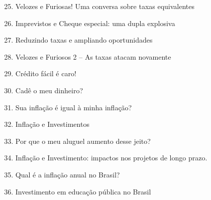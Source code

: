 \begin{apresentacao}
\begin{multicols}{3}
\begin{enumerate}[label=Atividade \arabic* --, wide]\setcounter{enumi}{24}
\item Velozes e Furiosas! Uma conversa sobre taxas equivalentes
\end{enumerate}
\begin{enumerate}[label=Atividade \arabic* --, wide]\setcounter{enumi}{25}
\item Imprevistos e Cheque especial: uma dupla explosiva
\item Reduzindo taxas e ampliando oportunidades
\item Velozes e Furiosos 2 -- As taxas atacam novamente
\item Crédito fácil é caro!
\end{enumerate}
\vspace{1em}
\clearpage

\begin{enumerate}[label=Atividade \arabic* --, wide]\setcounter{enumi}{29}
\item Cadê o meu dinheiro?
\item Sua inflação é igual à minha inflação?
\item Inflação e Investimentos
\item Por que o meu aluguel aumento desse jeito?
\end{enumerate}

\begin{enumerate}[label=Atividade \arabic* --, wide]\setcounter{enumi}{33}
\item Inflação e Investimento: impactos nos projetos de longo prazo.
\item Qual é a inflação anual no Brasil?
\end{enumerate}
\vspace{1em}

\columnbreak
{}
\begin{enumerate}[label=Atividade \arabic* --, wide]\setcounter{enumi}{35}
\item Investimento em educação pública no Brasil
\end{enumerate}


\end{multicols}
\end{apresentacao}
